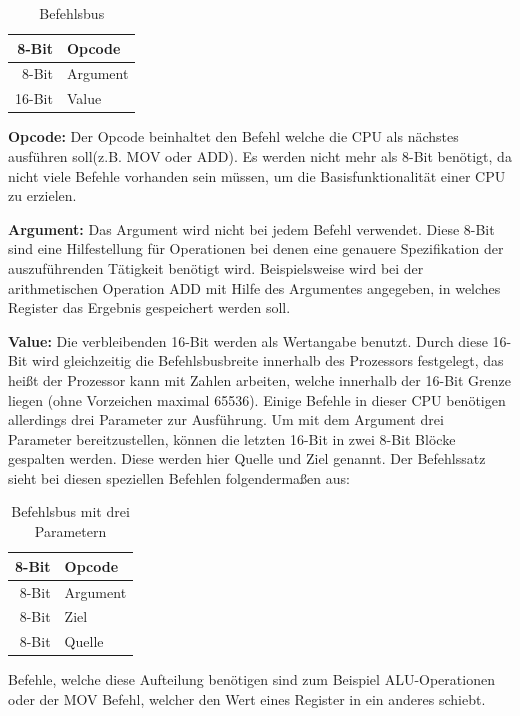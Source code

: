 \documentclass[a4paper,12pt]{article}
\begin{document}
\begin{table}[!htb]
\centering
\label{Befehlsbus}
\begin{tabular}{|r|l|}
  \hline
  8-Bit & Opcode \\
  \hline
  8-Bit & Argument \\ 
  \hline
  16-Bit & Value\\
  \hline
  
\end{tabular}
\caption{Befehlsbus}
\end{table}
\par\bigskip\noindent\textbf{Opcode: } Der Opcode beinhaltet den Befehl welche die CPU als nächstes ausführen soll(z.B. MOV oder ADD). Es werden nicht mehr als 8-Bit benötigt, da nicht viele Befehle vorhanden sein müssen, um die Basisfunktionalität einer CPU zu erzielen.
\par\bigskip\noindent\textbf{Argument: } Das Argument wird nicht bei jedem Befehl verwendet. Diese 8-Bit sind eine Hilfestellung für Operationen bei denen eine genauere Spezifikation der auszuführenden Tätigkeit benötigt wird. Beispielsweise wird bei der arithmetischen Operation ADD mit Hilfe des Argumentes angegeben, in welches Register das Ergebnis gespeichert werden soll.
\par\bigskip\noindent\textbf{Value: } Die verbleibenden 16-Bit werden als Wertangabe benutzt. Durch diese 16-Bit wird gleichzeitig die Befehlsbusbreite innerhalb des Prozessors festgelegt, das heißt der Prozessor kann mit Zahlen arbeiten, welche innerhalb der 16-Bit Grenze liegen (ohne Vorzeichen maximal 65536). Einige Befehle in dieser CPU benötigen allerdings drei Parameter zur Ausführung. Um mit dem Argument drei Parameter bereitzustellen, können die letzten 16-Bit in zwei 8-Bit Blöcke gespalten werden. Diese werden hier Quelle und Ziel genannt. Der Befehlssatz sieht bei diesen speziellen Befehlen folgendermaßen aus: 
\begin{table}[!htb]
\centering
\begin{tabular}{|r|l|}
  \hline
  8-Bit & Opcode \\
  \hline
  8-Bit & Argument \\ 
  \hline
  8-Bit & Ziel\\
  \hline
  8-Bit & Quelle\\
  \hline
\end{tabular}
\caption{Befehlsbus mit drei Parametern}
\label{Befehlsbus3P}
\end{table}
\newline
Befehle, welche diese Aufteilung benötigen sind zum Beispiel ALU-Operationen oder der MOV Befehl, welcher den Wert eines Register in ein anderes schiebt.
\end{document}

